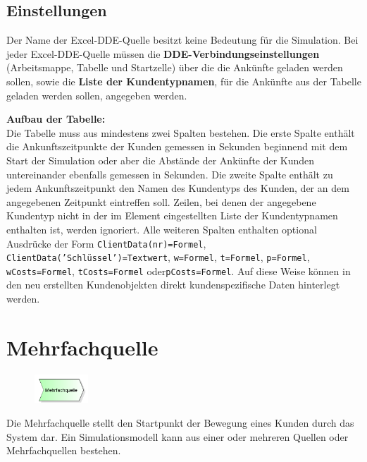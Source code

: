 \subsection*{Einstellungen}

Der Name der Excel-DDE-Quelle besitzt keine Bedeutung für die Simulation.
Bei jeder Excel-DDE-Quelle müssen die \textbf{DDE-Verbindungseinstellungen}
(Arbeitsmappe, Tabelle und Startzelle) über die die Ankünfte geladen werden sollen,
sowie die \textbf{Liste der Kundentypnamen},
für die Ankünfte aus der Tabelle geladen werden sollen, angegeben werden.

\textbf{Aufbau der Tabelle:}~\\
Die Tabelle muss aus mindestens zwei Spalten bestehen. Die erste Spalte enthält die Ankunftszeitpunkte
der Kunden gemessen in Sekunden beginnend mit dem Start der Simulation oder aber die Abstände
der Ankünfte der Kunden untereinander ebenfalls gemessen in Sekunden. Die zweite Spalte
enthält zu jedem Ankunftszeitpunkt den Namen des Kundentyps des Kunden, der an dem
angegebenen Zeitpunkt eintreffen soll. Zeilen, bei denen der angegebene Kundentyp
nicht in der im Element eingestellten Liste der Kundentypnamen enthalten ist, werden ignoriert.
Alle weiteren Spalten enthalten optional Ausdrücke der Form \texttt{ClientData(nr)=Formel},
\texttt{ClientData('Schlüssel')=Textwert}, \texttt{w=Formel}, \texttt{t=Formel},
\texttt{p=Formel}, \texttt{wCosts=Formel}, \texttt{tCosts=Formel} oder\texttt{pCosts=Formel}.
Auf diese Weise können in den neu erstellten Kundenobjekten direkt kundenspezifische Daten
hinterlegt werden.


\section{Mehrfachquelle}
\label{ref:ModelElementSourceMulti}

\begin{figure}
\vspace{-22pt}
\includegraphics[width=2cm]{imageModelElementSourceMulti.png}
\vspace{-22pt}
\end{figure}

Die Mehrfachquelle stellt den Startpunkt der Bewegung eines Kunden durch das System dar.
Ein Simulationsmodell kann aus einer oder mehreren Quellen oder Mehrfachquellen bestehen.

